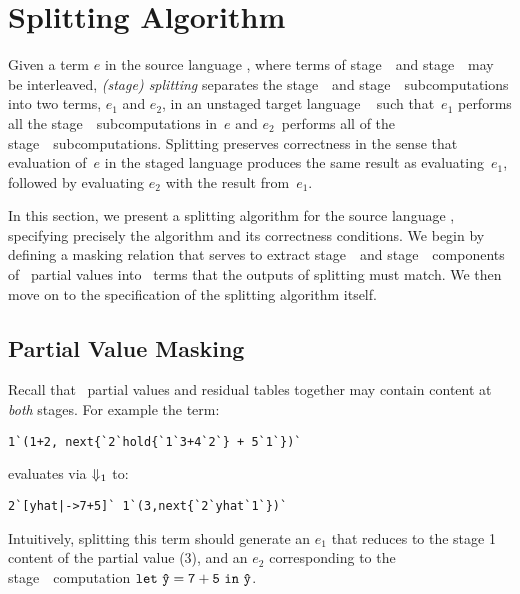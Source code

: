 \section{Splitting Algorithm}
\label{sec:splitting}

Given a term $e$ in the source language \lang, where terms of
stage~\bbone\ and stage~\bbtwo\ may be interleaved, \emph{(stage)
  splitting} separates the stage~\bbone\ and stage~\bbtwo\
subcomputations into two terms, $e_1$ and $e_2$, in an unstaged target language \langmono\ 
such that~$e_1$ performs all the
stage~\bbone\ subcomputations in~$e$ and $e_2$~performs all of the
stage~\bbtwo\ subcomputations. Splitting preserves correctness in the sense that evaluation of~$e$ in
the staged language produces the same result as evaluating~$e_1$, followed by evaluating 
$e_2$ with the result from~$e_1$.

In this section, we present a
splitting algorithm for the source language \lang, specifying
precisely the algorithm and its correctness conditions.  
We begin by defining a masking relation that serves to extract stage~\bbone\ and
stage~\bbtwo\ components of \lang\ partial values into \langmono\ terms that the outputs of splitting must match. We then 
move on to the specification of the splitting algorithm itself.


\subsection{Partial Value Masking}


Recall that \lang\ partial values and residual tables together may
contain content at \emph{both} stages. For example the term:
\begin{lstlisting}
1`(1+2, next{`2`hold{`1`3+4`2`} + 5`1`})`
\end{lstlisting}
evaluates via ${\Downarrow_{ 1}}$ to:
\begin{lstlisting}
2`[yhat|->7+5]` 1`(3,next{`2`yhat`1`})`
\end{lstlisting}
Intuitively, splitting this term should generate an $e_1$ that reduces to the stage 1 content of the partial value (3), and an $e_2$ corresponding to the stage~\bbtwo\
computation ${\tt let}~{\mathtt{\hat y}} = {\mathtt{7+5}}~{\tt in}~{\mathtt{\hat y}}$.

